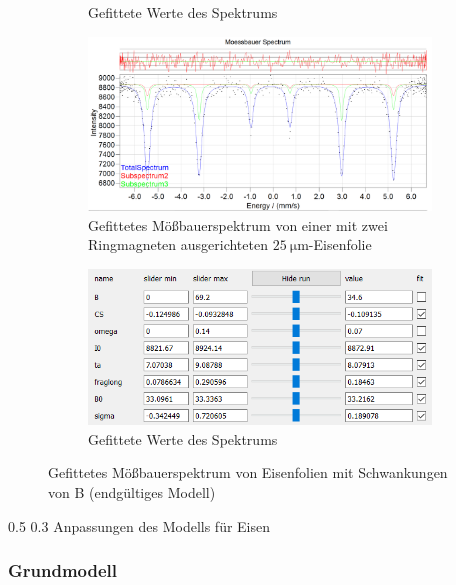 \documentclass[german, %
parskip=full, %
bibliography=totoc, %
]{scrartcl}
\makeatletter
\renewcommand\subsection{\@startsection 
   {subsection}{2}{0mm}%
   {0.5\baselineskip}%
   {0.3\baselineskip}%
   {\bfseries\sffamily\large}%
   }
\makeatother
\begin{document}
\begin{figure}[ht]
\begin{subfigure}[b]{0.4\textwidth}
	  \caption{Gefittete Werte des Spektrums}
	  \label{fig:werte25gerade}
  \end{subfigure}
	\begin{subfigure}[b]{0.5\textwidth}
		\includegraphics[width=\textwidth]{MoessbauerEisen25MagnetRing}
	  \caption{Gefittetes Mößbauerspektrum von einer mit zwei Ringmagneten ausgerichteten \(\SI{25}{\micro\meter}\)-Eisenfolie}
	  \label{fig:moess25ring}
  \end{subfigure}
  \begin{subfigure}[b]{0.4\textwidth}
	  \includegraphics[width=\textwidth]{WerteEisen25MagnetRing}
	  \caption{Gefittete Werte des Spektrums}
	  \label{fig:werte25ring}
  \end{subfigure}
	\caption{Gefittetes Mößbauerspektrum von Eisenfolien mit Schwankungen von B (endgültiges Modell)}
	\label{fig:eisen}
\end{figure}

\subsection{Anpassungen des Modells für Eisen}

\subsubsection{Grundmodell}
\end{document}
